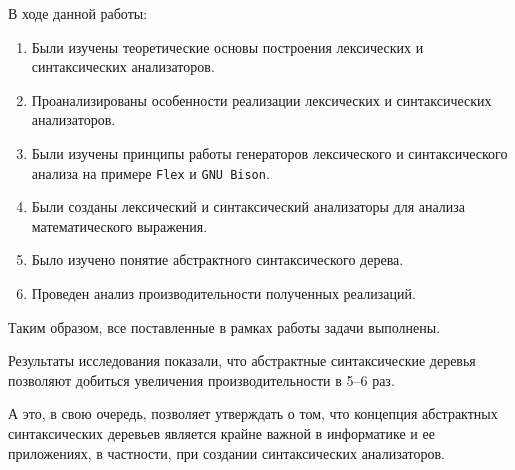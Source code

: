 В ходе данной работы:
\begin{enumerate}
    \item Были изучены теоретические основы построения лексических и синтаксических анализаторов.
    \item Проанализированы особенности реализации лексических и синтаксических анализаторов.
    \item Были изучены принципы работы генераторов лексического и синтаксического анализа на примере \texttt{Flex} и \texttt{GNU Bison}.
    \item Были созданы лексический и синтаксический анализаторы для анализа математического выражения.
    \item Было изучено понятие абстрактного синтаксического дерева.
    \item Проведен анализ производительности полученных реализаций.
\end{enumerate}
Таким образом, все поставленные в рамках работы задачи выполнены.

Результаты исследования показали, что абстрактные синтаксические деревья позволяют добиться увеличения производительности в 5--6 раз.

А это, в свою очередь, позволяет утверждать о том, что концепция абстрактных синтаксических деревьев является крайне важной в информатике и
ее приложениях, в частности, при создании синтаксических анализаторов.
